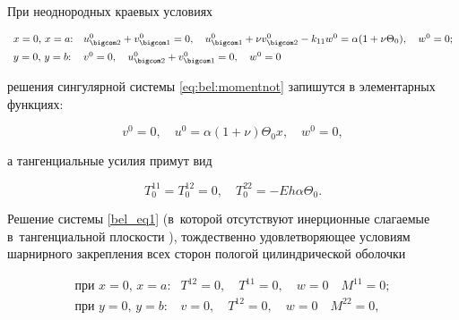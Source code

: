 При неоднородных краевых условиях

\begin{equation*}

\begin{array}{ll}

\text{$x=0$, $x=a$:}&

u^0_{\bigcom 2}+v^0_{\bigcom 1}=0, \quad u^0_{\bigcom 1}+\nu v^0_{\bigcom 2}-k_{11}w^0=\alpha(1+\nu \Theta_0), \quad w^0=0;

\\[2mm]

\text{$y=0$, $y=b$:}&

v^0=0, \quad u^0_{\bigcom 2}+ v^0_{\bigcom 1}=0, \quad w^0=0

\end{array}

\end{equation*}

решения сингулярной системы \eqref{eq:bel:momentnot} запишутся в элементарных функциях:

\begin{equation}\label{bel_gr1}

v^0=0, \quad u^0=\alpha(1+\nu)\Theta_0 x, \quad w^0=0,

\end{equation}

а тангенциальные усилия примут вид

\begin{equation*}

T^{11}_0=T^{12}_0=0, \quad T^{22}_0=-E h\alpha\Theta_0.

\end{equation*}



Решение системы \eqref{bel_eq1} (в~которой отсутствуют инерционные слагаемые в~тангенциальной плоскости \cite{myl-bib:1,myl-bib:6, myl-bib:7}), тождественно удовлетворяющее условиям шарнирного закрепления всех сторон пологой цилиндрической оболочки

\begin{equation*}

\begin{array}{ll}

\text{при $x=0$, $x=a$:} &

T^{12}=0, \quad T^{11}=0, \quad w=0 \quad M^{11}=0;

\\[2mm]

\text{при $y=0$, $y=b$:} &

v=0, \quad T^{12}=0, \quad w=0 \quad M^{22}=0,

\end{array}

\end{equation*}

